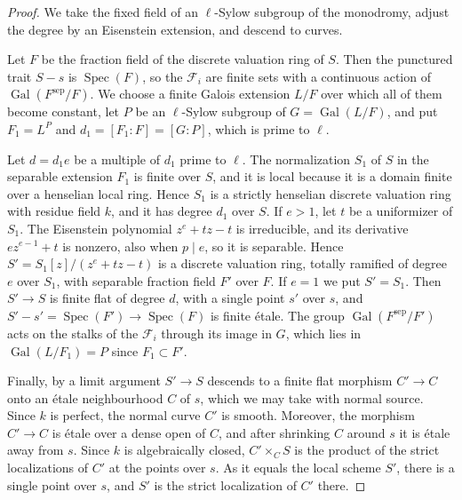 \documentclass[11pt]{article}
\begin{document}
\begin{proof}[{Proof}]\label{bp39}%
We take the fixed field of an \(\ell\)-Sylow subgroup of the monodromy, adjust the degree by an Eisenstein extension, and descend to curves.

Let \(F\) be the fraction field of the discrete valuation ring of \(S\). Then the punctured trait \(S-s\) is \(\operatorname{Spec}(F)\), so the \(\mathcal F_i\) are finite sets with a continuous action of \(\operatorname{Gal}(F^{\mathrm{sep}}/F)\). We choose a finite Galois extension \(L/F\) over which all of them become constant, let \(P\) be an \(\ell\)-Sylow subgroup of \(G=\operatorname{Gal}(L/F)\), and put \(F_1=L^P\) and \(d_1=[F_1:F]=[G:P]\), which is prime to \(\ell\).

Let \(d=d_1e\) be a multiple of \(d_1\) prime to \(\ell\). The normalization \(S_1\) of \(S\) in the separable extension \(F_1\) is finite over \(S\), and it is local because it is a domain finite over a henselian local ring. Hence \(S_1\) is a strictly henselian discrete valuation ring with residue field \(k\), and it has degree \(d_1\) over \(S\). If \(e>1\), let \(t\) be a uniformizer of \(S_1\). The Eisenstein polynomial \(z^e+tz-t\) is irreducible, and its derivative \(ez^{e-1}+t\) is nonzero, also when \(p\mid e\), so it is separable. Hence \(S'=S_1[z]/(z^e+tz-t)\) is a discrete valuation ring, totally ramified of degree \(e\) over \(S_1\), with separable fraction field \(F'\) over \(F\). If \(e=1\) we put \(S'=S_1\). Then \(S'\to S\) is finite flat of degree \(d\), with a single point \(s'\) over \(s\), and \(S'-s'=\operatorname{Spec}(F')\to
\operatorname{Spec}(F)\) is finite étale. The group \(\operatorname{Gal}(F^{\mathrm{sep}}/F')\) acts on the stalks of the \(\mathcal F_i\) through its image in \(G\), which lies in \(\operatorname{Gal}(L/F_1)=P\) since \(F_1\subset F'\).

Finally, by a limit argument \(S'\to S\) descends to a finite flat morphism \(C'\to C\) onto an étale neighbourhood \(C\) of \(s\), which we may take with normal source. Since \(k\) is perfect, the normal curve \(C'\) is smooth. Moreover, the morphism \(C'\to C\) is étale over a dense open of \(C\), and after shrinking \(C\) around \(s\) it is étale away from \(s\). Since \(k\) is algebraically closed, \(C'\times_CS\) is the product of the strict localizations of \(C'\) at the points over \(s\). As it equals the local scheme \(S'\), there is a single point over \(s\), and \(S'\) is the strict localization of \(C'\) there.
\end{proof}
\end{document}
